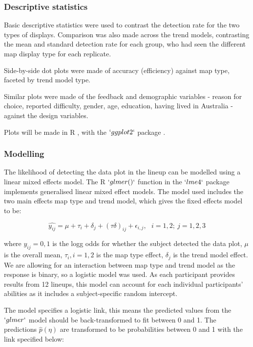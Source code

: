 \documentclass[12pt]{article}
\begin{document}
\hypertarget{descriptive-statistics}{%
\subsubsection{Descriptive statistics}\label{descriptive-statistics}}

Basic descriptive statistics were used to contrast the detection rate
for the two types of displays. Comparison was also made across the trend
models, contrasting the mean and standard detection rate for each group,
who had seen the different map display type for each replicate.

Side-by-side dot plots were made of accuracy (efficiency) against map
type, faceted by trend model type.

Similar plots were made of the feedback and demographic variables -
reason for choice, reported difficulty, gender, age, education, having
lived in Australia - against the design variables.

Plots will be made in R \citep{RCore}, with the \(`ggplot2`\) package
\citep{ggplot2}.

\hypertarget{modelling}{%
\subsubsection{Modelling}\label{modelling}}

The likelihood of detecting the data plot in the lineup can be modelled
using a linear mixed effects model. The R \citep{RCore} \(`glmer()`\)
function in the \(`lme4`\) \citep{lme4} package implements generalised
linear mixed effect models. The model used includes the two main effects
map type and trend model, which gives the fixed effects model to be:

\[\widehat{y_{ij}} = \mu + \tau_i + \delta_j + (\tau\delta)_{ij} + \epsilon_{i,j}, ~~~ i=1,2; ~j=1,2,3\]

where \(y_{ij} = 0, 1\) is the logg odds for whether the subject
detected the data plot, \(\mu\) is the overall mean, \(\tau_i, i=1,2\)
is the map type effect, \(\delta_j\) is the trend model effect. We are
allowing for an interaction between map type and trend model as the
response is binary, so a logistic model was used. As each participant
provides results from 12 lineups, this model can account for each
individual participants' abilities as it includes a subject-specific
random intercept.

The model specifies a logistic link, this means the predicted values
from the \(`glmer`\) model should be back-transformed to fit between 0
and 1. The predictions \(\widehat{p}(\eta)\) are transformed to be
probabilities between 0 and 1 with the link specified below:
\end{document}
